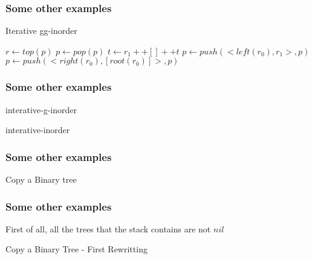 \documentclass{beamer}
\begin{document}
\begin{frame}
	\frametitle{Some other examples}
	\begin{block}{Iterative gg-inorder}
		\begin{algorithmic}[1]
					\State $r \gets top(p)$
					\State $p \gets pop(p)$
						\State $t \gets r_1 ++ [] ++ t$
					\Else
						\State $p \gets push(<left(r_0),r_1>,p)$
						\State $p \gets push(<right(r_0),[root(r_0)]>,p)$
					\EndIf
				\EndWhile
				\State {}
			\EndProcedure
		\end{algorithmic}
	\end{block}
\end{frame}
\begin{frame}
	\frametitle{Some other examples}
	\begin{block}{interative-g-inorder}
		\begin{algorithmic}[1]
				\State {}
			\EndProcedure
		\end{algorithmic}
	\end{block}
	\begin{block}{interative-inorder}
		\begin{algorithmic}[1]
				\State {}
			\EndProcedure
		\end{algorithmic}
	\end{block}
\end{frame}
\begin{frame}
	\frametitle{Some other examples}
	\begin{block}{Copy a Binary tree}
		\begin{algorithmic}[1]
					\State {}
				\Else
					\State {}
				\EndIf
			\EndProcedure
		\end{algorithmic}
	\end{block}
\end{frame}
\begin{frame}
	\frametitle{Some other examples}
	First of all, all the trees that the stack contains are not $nil$
	\begin{block}{Copy a Binary Tree - First Rewritting}
		\tiny
		\begin{algorithmic}[1]
					\State {}
				\Else
						\State{}
					\Else
						\State{}
					\EndIf
				\EndIf
			\EndProcedure
		\end{algorithmic}
	\end{block}
\end{frame}
\end{document}
